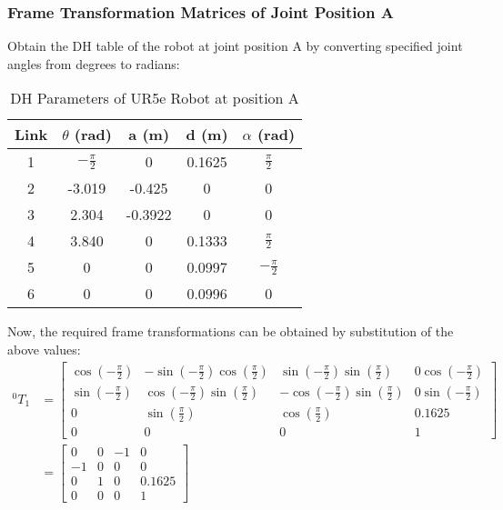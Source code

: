 \documentclass[fleqn]{article}
\begin{document}
\subsubsection{Frame Transformation Matrices of Joint Position A}
Obtain the DH table of the robot at joint position A by converting specified joint angles from degrees to radians:
\begin{table}[!ht]
    \caption{DH Parameters of UR5e Robot at position A}
    \begin{center}
    \begin{tabular}{||c | c | c | c | c||} 
     \hline
     Link & $\theta$ (rad) & a (m) & d (m) & $\alpha$ (rad)\\
     \hline\hline
     1 & $-\frac{\pi}{2}$ & 0 & 0.1625 & $\frac{\pi}{2}$ \\ [1ex] 
     \hline
     2 & -3.019 & -0.425 & 0 & 0 \\ [1ex] 
     \hline
     3 & 2.304 & -0.3922 & 0 & 0 \\ [1ex] 
     \hline
     4 & 3.840 & 0 & 0.1333 & $\frac{\pi}{2}$ \\ [1ex] 
     \hline
     5 & 0 & 0 & 0.0997 & $-\frac{\pi}{2}$ \\ [1ex] 
     \hline
     6 & 0 & 0 & 0.0996 & 0 \\ [1ex] 
     \hline
    \end{tabular}
    \end{center}
\end{table}

Now, the required frame transformations can be obtained by substitution of the above values: 
\begin{equation}
\begin{split}
^{0}T_{1}&=\begin{bmatrix}
\cos(-\frac{\pi}{2}) & -\sin(-\frac{\pi}{2})\cos(\frac{\pi}{2}) & \sin(-\frac{\pi}{2})\sin(\frac{\pi}{2}) & 0\cos(-\frac{\pi}{2})\\
\sin(-\frac{\pi}{2}) & \cos(-\frac{\pi}{2})\sin(\frac{\pi}{2}) & -\cos(-\frac{\pi}{2})\sin(\frac{\pi}{2}) & 0\sin(-\frac{\pi}{2})\\
0 & \sin(\frac{\pi}{2}) & \cos(\frac{\pi}{2}) & 0.1625\\
0 & 0 & 0 & 1
\end{bmatrix}\\
&=\begin{bmatrix}
0 & 0 & -1 & 0\\
-1 & 0 & 0 & 0\\
0 & 1 & 0 & 0.1625\\
0 & 0 & 0 & 1
\end{bmatrix}
\end{split}
\end{equation}
\end{document}

